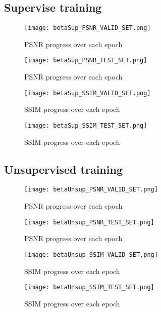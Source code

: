 \subsection{Supervise training}
\begin{figure}[tb] 
\centering 
\texttt{[image: betaSup\_PSNR\_VALID\_SET.png]} 
\caption[PSNR validation progress during training of supervised alpha network]{PSNR progress over each epoch}
\label{fig:betaSupValidPSNR} 
\end{figure}  

\begin{figure}[tb] 
\centering 
\texttt{[image: betaSup\_PSNR\_TEST\_SET.png]} 
\caption[PSNR testing progress during training of supervised alpha network]{PSNR progress over each epoch}
\label{fig:betaSupTestPSNR} 
\end{figure}  

\begin{figure}[tb] 
\centering 
\texttt{[image: betaSup\_SSIM\_VALID\_SET.png]} 
\caption[SSIM validation progress during training of supervised alpha network]{SSIM progress over each epoch}
\label{fig:betaSupValidSSIM} 
\end{figure}  

\begin{figure}[tb] 
\centering 
\texttt{[image: betaSup\_SSIM\_TEST\_SET.png]} 
\caption[SSIM testing progress during training of supervised alpha network]{SSIM progress over each epoch}
\label{fig:betaSupTestSSIM} 
\end{figure}  

\subsection{Unsupervised training}

\begin{figure}[tb] 
\centering 
\texttt{[image: betaUnsup\_PSNR\_VALID\_SET.png]} 
\caption[PSNR validation progress during training of supervised alpha network]{PSNR progress over each epoch}
\label{fig:betaUnsupValidPSNR} 
\end{figure}  

\begin{figure}[tb] 
\centering 
\texttt{[image: betaUnsup\_PSNR\_TEST\_SET.png]} 
\caption[PSNR testing progress during training of supervised alpha network]{PSNR progress over each epoch}
\label{fig:betaUnsupTestPSNR} 
\end{figure}  

\begin{figure}[tb] 
\centering 
\texttt{[image: betaUnsup\_SSIM\_VALID\_SET.png]} 
\caption[SSIM validation progress during training of supervised alpha network]{SSIM progress over each epoch}
\label{fig:betaUnsupValidSSIM} 
\end{figure}  

\begin{figure}[tb] 
\centering 
\texttt{[image: betaUnsup\_SSIM\_TEST\_SET.png]} 
\caption[SSIM testing progress during training of supervised alpha network]{SSIM progress over each epoch}
\label{fig:betaUnsupTestSSIM} 
\end{figure}  
